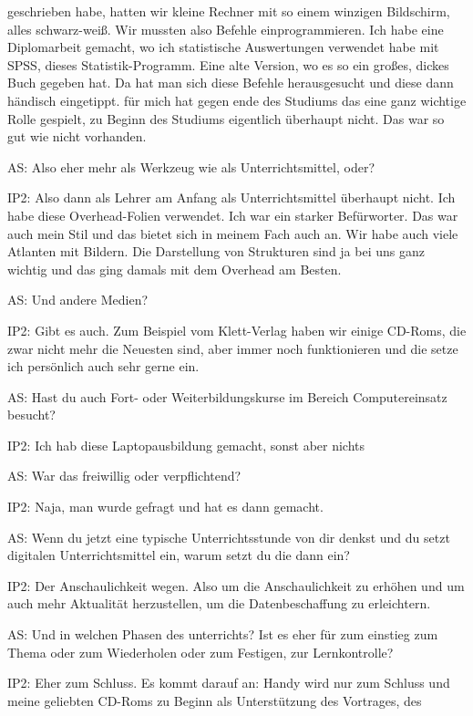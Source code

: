 \documentclass[fontsize=11pt,paper=a4]{scrbook}
\begin{document}
{\begin{itemize*}
geschrieben habe, hatten wir kleine
Rechner mit so einem winzigen Bildschirm, alles schwarz-weiß. Wir mussten also Befehle
einprogrammieren. Ich habe eine Diplomarbeit gemacht, wo ich statistische Auswertungen verwendet habe mit SPSS, dieses Statistik-Programm. Eine alte Version, wo es so ein großes, dickes Buch gegeben hat. Da hat man sich diese Befehle herausgesucht und diese dann händisch eingetippt. für mich hat
gegen ende des Studiums das eine ganz
wichtige Rolle gespielt, zu Beginn des Studiums eigentlich überhaupt nicht. Das war so gut wie nicht vorhanden.
\item[AS:] Also  eher mehr als Werkzeug wie als Unterrichtsmittel, oder?
\item[IP2:] Also dann als Lehrer am
Anfang als Unterrichtsmittel überhaupt nicht. Ich habe diese Overhead-Folien verwendet. Ich war ein starker Befürworter. Das war auch mein
Stil und das bietet sich in meinem Fach auch an. Wir habe auch viele Atlanten mit Bildern. 
Die Darstellung  von Strukturen sind ja bei uns ganz wichtig und das ging damals mit
dem Overhead am Besten.
\item[AS:] Und andere Medien?
\item[IP2:] Gibt es auch. Zum Beispiel vom Klett-Verlag haben wir einige CD-Roms, die zwar nicht mehr die Neuesten sind, aber immer noch funktionieren und die setze ich
persönlich auch sehr gerne ein.
\item[AS:] Hast du auch Fort- oder Weiterbildungskurse
im Bereich Computereinsatz besucht?
\item[IP2:] Ich hab diese Laptopausbildung gemacht, sonst aber nichts
\item[AS:] War das freiwillig
oder verpflichtend?
\item[IP2:] Naja, man wurde gefragt und hat es dann gemacht.
 \item[AS:] Wenn du jetzt eine typische
Unterrichtsstunde von dir denkst und du
setzt digitalen Unterrichtsmittel ein, 
warum setzt du die dann ein?
\item[IP2:] Der Anschaulichkeit wegen. Also um die Anschaulichkeit zu erhöhen und um auch
mehr Aktualität herzustellen, um die Datenbeschaffung zu erleichtern.
\item[AS:]   Und
in welchen Phasen des unterrichts? Ist es
eher für zum einstieg zum Thema oder  zum
Wiederholen oder zum Festigen, zur Lernkontrolle?
\item[IP2:] Eher 
zum Schluss. Es kommt darauf an: 
Handy wird nur zum Schluss und meine
geliebten CD-Roms zu Beginn als
Unterstützung des  Vortrages, des

\end{itemize*}}
\end{document}

